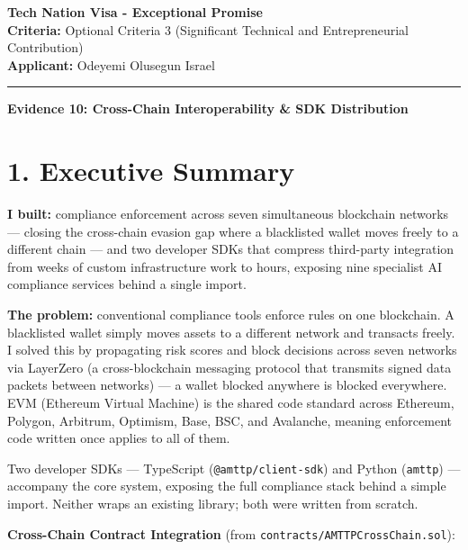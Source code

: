 \documentclass[11pt,a4paper]{article}
\begin{document}
\noindent\textbf{\Large Tech Nation Visa - Exceptional Promise}\\
\noindent\textbf{Criteria:} Optional Criteria 3 (Significant Technical and Entrepreneurial Contribution)\\
\noindent\textbf{Applicant:} Odeyemi Olusegun Israel\\
\rule{\textwidth}{0.4pt}

\vspace{0.5cm}
\begin{center}
    \textbf{\huge Evidence 10: Cross-Chain Interoperability \& SDK Distribution}
\end{center}
\vspace{0.5cm}

\section*{1. Executive Summary}
\textbf{I built:} compliance enforcement across seven simultaneous blockchain networks --- closing the cross-chain evasion gap where a blacklisted wallet moves freely to a different chain --- and two developer SDKs that compress third-party integration from weeks of custom infrastructure work to hours, exposing nine specialist AI compliance services behind a single import.

\textbf{The problem:} conventional compliance tools enforce rules on one blockchain. A blacklisted wallet simply moves assets to a different network and transacts freely. I solved this by propagating risk scores and block decisions across seven networks via LayerZero (a cross-blockchain messaging protocol that transmits signed data packets between networks) --- a wallet blocked anywhere is blocked everywhere. EVM (Ethereum Virtual Machine) is the shared code standard across Ethereum, Polygon, Arbitrum, Optimism, Base, BSC, and Avalanche, meaning enforcement code written once applies to all of them.

Two developer SDKs --- TypeScript (\texttt{@amttp/client-sdk}) and Python (\texttt{amttp}) --- accompany the core system, exposing the full compliance stack behind a simple import. Neither wraps an existing library; both were written from scratch.

\vspace{0.3cm}
\noindent\textbf{Cross-Chain Contract Integration} (from \texttt{contracts/AMTTPCrossChain.sol}):
\end{document}

